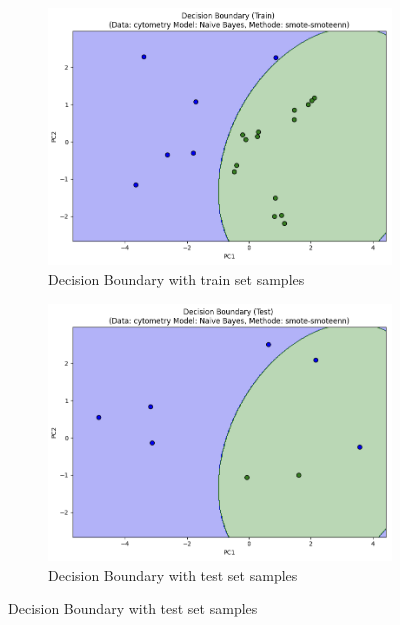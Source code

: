 \documentclass[12pt,a4paper]{report}
\begin{document}
\begin{figure}[h!]
    \begin{subfigure}[b]{0.48\textwidth}
        \centering
        \includegraphics[width=\textwidth]{images/smote_een_fig2c.png}
        \caption{Decision Boundary with train set samples}
        \label{fig:smote_enn_fig2c}
    \end{subfigure}
    \hfill
    \begin{subfigure}[b]{0.48\textwidth}
        \centering
        \includegraphics[width=\textwidth]{images/smote_een_fig2d.png}
        \caption{Decision Boundary with test set samples}
        \label{fig:smote_enn_fig2d}
    \end{subfigure}



\end{figure}
\end{document}
